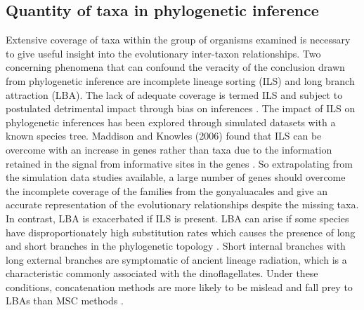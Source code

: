 \documentclass[12pt]{article}
\begin{document}
\subsection*{Quantity of taxa in phylogenetic inference}
Extensive coverage of taxa within the group of organisms examined is necessary to give useful insight into the evolutionary inter-taxon relationships.
Two concerning phenomena that can confound the veracity of the conclusion drawn from phylogenetic inference are incomplete lineage sorting (ILS) and long branch attraction (LBA). 
The lack of adequate coverage is termed ILS and subject to postulated detrimental impact through bias on inferences \cite{heath2008taxon}. 
The impact of ILS on phylogenetic inferences has been explored through simulated datasets with a known species tree. 
Maddison and Knowles (2006) found that ILS can be overcome with an increase in genes rather than taxa due to the information retained in the signal from informative sites in the genes \cite{maddison2006inferring}. 
So extrapolating from the simulation data studies available, a large number of genes should overcome the incomplete coverage of the families from the gonyaluacales and give an accurate representation of the evolutionary relationships despite the missing taxa. 
In contrast, LBA is exacerbated if ILS is present. 
LBA can arise if some species have disproportionately high substitution rates which causes the presence of long and short branches in the phylogenetic topology \cite{liu2014coalescent}. 
Short internal branches with long external branches are symptomatic of ancient lineage radiation, which is a characteristic commonly associated with the dinoflagellates. 
Under these conditions, concatenation methods are more likely to be mislead and fall prey to LBAs than MSC methods \cite{liu2014coalescent}.
\end{document}

